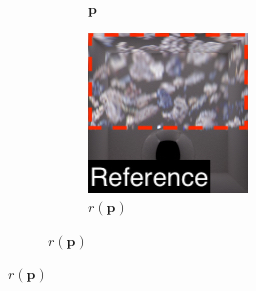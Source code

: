 \begin{figure}[]
\begin{subfigure}{\textwidth}
\begin{subfigure}{0.19\textwidth}
            \caption*{\(\bm{p}\)}
        \end{subfigure}
        \hfill
        \begin{subfigure}{0.19\textwidth}
            \centering
            \includegraphics[width=\textwidth]{images/04-experiment03/ball_dof/pebbles/pixel_proj_highlighted2.jpg}
            \caption*{\(r(\bm{p})\)}
        \end{subfigure}
        

\end{subfigure}
\end{figure}
